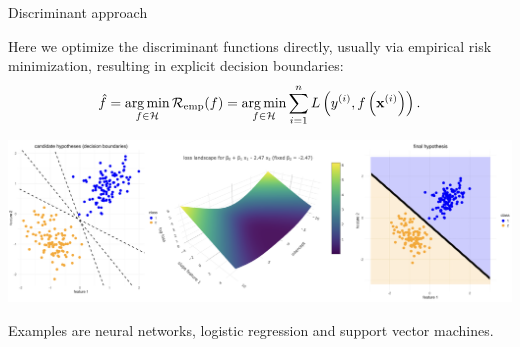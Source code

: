 \documentclass[11pt,compress,t,notes=noshow, xcolor=table]{beamer}
\begin{document}
\begin{vbframe}{Discriminant approach}

Here we optimize the discriminant functions directly, usually via empirical risk minimization, resulting in explicit decision boundaries:
$$ \hat{f} = \operatorname*{arg\,min}_{f \in \mathcal{H}} \mathcal{R}_{\text{emp}}(f) = \operatorname*{arg\,min}_{f \in \mathcal{H}} \sum\limits_{i=1}^n L\left(y^{(i)}, f\left(\mathbf{x}^{(i)}\right)\right).$$

\begin{center}
\includegraphics[width=\textwidth]{figure_man/disc_approach.png} 
\end{center}

\small{
Examples are neural networks, logistic regression and support vector machines.
}

\end{vbframe}

\endlecture
\end{document}
